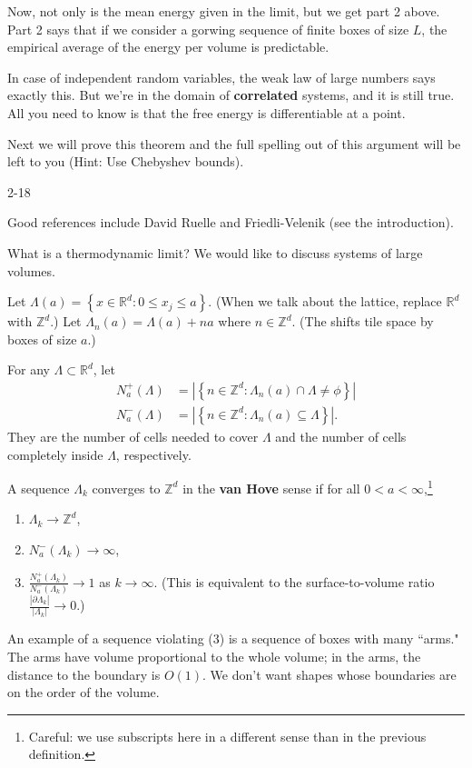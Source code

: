 \documentclass[12pt]{book}
\theoremstyle{norm}
\begin{document}
Now, not only is the mean energy given in the limit, but we get part 2 above. Part 2 says that if we consider a gorwing sequence of finite boxes of size $L$, the empirical average of the energy per volume is predictable. 

In case of independent random variables, the weak law of large numbers says exactly this. But we're in the domain of \textbf{correlated} systems, and it is still true. All you need to know is that the free energy is differentiable at a point. 

Next we will prove this theorem and the full spelling out of this argument will be left to you (Hint: Use Chebyshev bounds). 








{\color{blue}2-18}


Good references include David Ruelle and Friedli-Velenik (see the introduction).

What is a thermodynamic limit? We would like to discuss systems of large volumes.
\begin{definition}
Let $\Lambda(a) = \left\{{x\in \mathbb{R}^d}:{0\le x_j\le a}\right\}$. (When we talk about the lattice, replace $\mathbb{R}^d$ with $\mathbb{Z}^d$.) Let $\Lambda_n (a) = \Lambda(a)+na$ where $n\in \mathbb{Z}^d$. (The shifts tile space by boxes of size $a$.)

For any $\Lambda\subset \mathbb{R}^d$, let 
\begin{align*}
N_a^+(\Lambda) &= \left| {\left\{{n\in\mathbb{Z}^d}:{\Lambda_n(a) \cap \Lambda \ne \phi}\right\}} \right|\\
N_a^-(\Lambda)&=  \left| {\left\{{n\in\mathbb{Z}^d}:{\Lambda_n(a) \subseteq \Lambda}\right\}} \right|.
\end{align*}
They are the number of cells needed to cover $\Lambda$ and the number of cells completely inside $\Lambda$, respectively.
\end{definition}
\begin{definition}
A sequence $\Lambda_k$ converges to $\mathbb{Z}^d$ in the \textbf{van Hove} sense if for all $0<a<\infty$,\footnote{Careful: we use subscripts here in a different sense than in the previous definition.}
\begin{enumerate}
\item
$\Lambda_k\to \mathbb{Z}^d$,
\item
$N_a^-(\Lambda_k) \to \infty$,
\item
$\frac{N_a^+(\Lambda_k)}{N_a^-(\Lambda_k)}\to 1$ as $k\to \infty$. (This is equivalent to the surface-to-volume ratio $\frac{|\partial \Lambda_k|}{|\Lambda_k|}\to 0$.)
\end{enumerate}
\end{definition}
An example of a sequence violating (3) is a sequence of boxes with many ``arms." The arms have volume proportional to the whole volume; in the arms, the distance to the boundary is $O(1)$. We don't want shapes whose boundaries are on the order of the volume.
\end{document}
